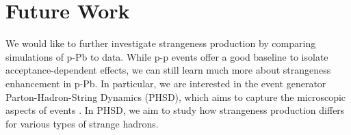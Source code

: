 \documentclass[../main.tex]{subfiles}
\begin{document}
\section{Future Work}
We would like to further investigate strangeness production by comparing simulations of p-Pb to data. While p-p events offer a good baseline to isolate acceptance-dependent effects, we can still learn much more about strangeness enhancement in p-Pb. In particular, we are interested in the event generator Parton-Hadron-String Dynamics (PHSD), which aims to capture the microscopic aspects of events \cite{Cassing:2009vt}. In PHSD, we aim to study how strangeness production differs for various types of strange hadrons.   
 

\ifSubfilesClassLoaded{%
    \printbibliography
}
\end{document}
